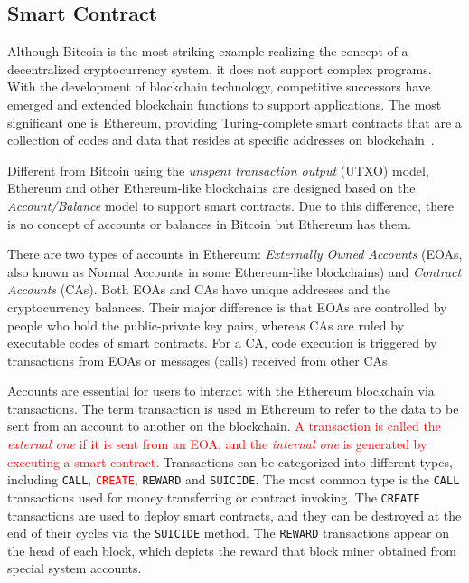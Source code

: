 \subsection{Smart Contract}
Although Bitcoin is the most striking example realizing the concept of a decentralized cryptocurrency system, it does not support complex programs. With the development of blockchain technology, competitive successors have emerged and extended blockchain functions to support applications. The most significant one is Ethereum, providing Turing-complete smart contracts that are a collection of codes and data that resides at specific addresses on blockchain~\cite{buterin2013ethereum}.

Different from Bitcoin using the \emph{unspent transaction output} (UTXO) model, Ethereum and other Ethereum-like blockchains are designed based on the \emph{Account/Balance} model to support smart contracts. Due to this difference, there is no concept of accounts or balances in Bitcoin but Ethereum has them.

There are two types of accounts in Ethereum: \emph{Externally Owned Accounts} (EOAs, also known as Normal Accounts in some Ethereum-like blockchains) and \emph{Contract Accounts} (CAs). Both EOAs and CAs have unique addresses and the cryptocurrency balances. Their major difference is that EOAs are controlled by people who hold the public-private key pairs, whereas CAs are ruled by executable codes of smart contracts. For a CA, code execution is triggered by transactions from EOAs or messages (calls) received from other CAs.

Accounts are essential for users to interact with the Ethereum blockchain via transactions. The term transaction is used in Ethereum to refer to the data to be sent from an account to another on the blockchain. \textcolor{red}{A transaction is called the \emph{external one} if it is sent from an EOA, and the \emph{internal one} is generated by executing a smart contract.} %
Transactions can be categorized into different types, including \texttt{CALL}, \textcolor{red}{\texttt{CREATE}}, \texttt{REWARD} and \texttt{SUICIDE}. The most common type is the \texttt{CALL} transactions used for money transferring or contract invoking. The \texttt{CREATE} transactions are used to deploy smart contracts, and they can be destroyed at the end of their cycles via the \texttt{SUICIDE} method. The \texttt{REWARD} transactions appear on the head of each block, which depicts the reward that block miner obtained from special system accounts.

